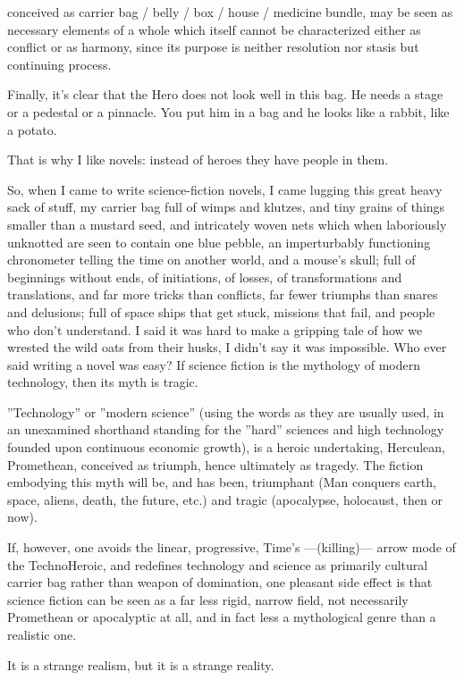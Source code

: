 conceived as carrier
bag / belly / box / house / medicine bundle, may be
seen as necessary elements of a whole which
itself cannot be characterized either as conflict
or as harmony, since its purpose is neither
resolution nor stasis but continuing process.

Finally, it’s clear that the Hero does not look
well in this bag. He needs a stage or a pedestal or
a pinnacle. You put him in a bag and he looks like
a rabbit, like a potato.

That is why I like novels: instead of heroes
they have people in them.

So, when I came to write science-fiction
novels, I came lugging this great heavy sack of
stuff, my carrier bag full of wimps and klutzes,
and tiny grains of things smaller than a mustard
seed, and intricately woven nets which when
laboriously unknotted are seen to contain one
blue pebble, an imperturbably functioning
chronometer telling the time on another world,
and a mouse’s skull; full of beginnings without
ends, of initiations, of losses, of transformations
and translations, and far more tricks than
conflicts, far fewer triumphs than snares and
delusions; full of space ships that get stuck,
missions that fail, and people who don’t
understand. I said it was hard to make a gripping
tale of how we wrested the wild oats from their
husks, I didn’t say it was impossible. Who ever
said writing a novel was easy? If science fiction 
is the mythology of modern technology, then its
myth is tragic. 

''Technology'' or ''modern science'' (using the 
words as they are usually used, in an unexamined 
shorthand standing for the ''hard'' sciences and high
technology founded upon continuous economic
growth), is a heroic undertaking, Herculean,
Promethean, conceived as triumph, hence
ultimately as tragedy. The fiction embodying this
myth will be, and has been, triumphant (Man
conquers earth, space, aliens, death, the future,
etc.) and tragic (apocalypse, holocaust, then or
now).

If, however, one avoids the linear, progressive,
Time’s ---(killing)--- arrow mode of the TechnoHeroic,
and redefines technology and science as
primarily cultural carrier bag rather than weapon
of domination, one pleasant side effect is that
science fiction can be seen as a far less rigid,
narrow field, not necessarily Promethean or
apocalyptic at all, and in fact less a mythological
genre than a realistic one.

It is a strange realism, but it is a strange reality.

